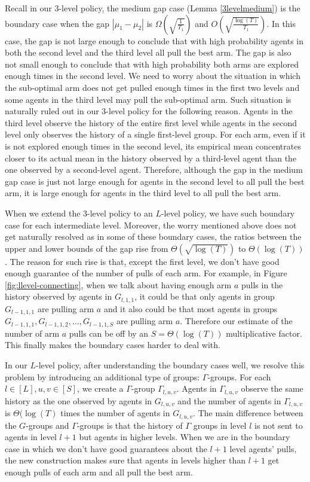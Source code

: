  Recall in our 3-level policy, the medium gap case (Lemma \ref{3levelmedium}) is the boundary case when the gap $|\mu_1-\mu_2|$ is $\Omega\left(\sqrt{\frac{1}{T_1}}\right)$ and $O\left(\sqrt{\frac{\log(T)}{T_1}}\right)$. In this case, the gap is not large enough to conclude that with high probability agents in both the second level and the third level all pull the best arm. The gap is also not small enough to conclude that with high probability both arms are explored enough times in the second level. We need to worry about the situation in which the sub-optimal arm does not get pulled enough times in the first two levels and some agents in the third level may pull the sub-optimal arm. Such situation is naturally ruled out in our 3-level policy for the following reason. Agents in the third level observe the history of the entire first level while agents in the second level only observes the history of a single first-level group. For each arm, even if it is not explored enough times in the second level, its empirical mean concentrates closer to its actual mean in the history observed by a third-level agent than the one observed by a second-level agent. Therefore, although the gap in the medium gap case is just not large enough for agents in the second level to all pull the best arm, it is large enough for agents in the third level to all pull the best arm.

When we extend the 3-level policy to an $L$-level policy, we have such boundary case for each intermediate level. Moreover, the worry mentioned above does not get naturally resolved as in some of these boundary cases, the ratios between the upper and lower bounds of the gap rise from $\Theta(\sqrt{\log(T)})$ to $\Theta(\log(T))$. The reason for such rise is that, except the first level, we don't have good enough guarantee of the number of pulls of each arm. For example, in Figure \ref{fig:llevel-connecting}, when we talk about having enough arm $a$ pulls in the history observed by agents in $G_{l,1,1}$, it could be that  only agents in group $G_{l-1,1,1}$ are pulling arm $a$ and it also could be that most agents in groups $G_{l-1,1,1},G_{l-1,1,2},...,G_{l-1,1,S}$ are pulling arm $a$. Therefore our estimate of the number of arm $a$ pulls can be off by an $S=\Theta(\log(T))$ multiplicative factor. This finally makes the boundary cases harder to deal with.

In our $L$-level policy, after understanding the boundary cases well, we resolve this problem by introducing an additional type of groups: $\Gamma$-groups. For each $l \in [L], u,v \in [S]$, we create a $\Gamma$-group $\Gamma_{l,u,v}$. Agents in $\Gamma_{l,u,v}$ observe the same history as the one observed by agents in $G_{l,u,v}$ and the number of agents in $\Gamma_{l,u,v}$ is $\Theta(\log(T)$ times the number of agents in $G_{l,u,v}$. The main difference between the $G$-groups and $\Gamma$-groups is that the history of $\Gamma$ groups in level $l$ is not sent to agents in level $l+1$ but agents in higher levels. When we are in the boundary case in which we don't have good guarantees about the $l+1$ level agents' pulls, the new construction makes sure that agents in levels higher than $l+1$ get enough pulls of each arm and all pull the best arm. 
